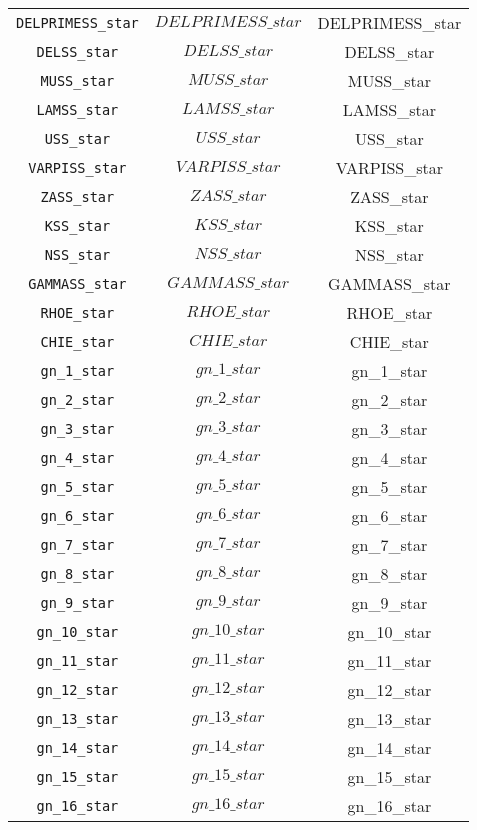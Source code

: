 \begin{center}
\begin{longtable}{ccc}
\texttt{DELPRIMESS\_star} & $DELPRIMESS\_star$ & DELPRIMESS\_star\\
\texttt{DELSS\_star} & $DELSS\_star$ & DELSS\_star\\
\texttt{MUSS\_star} & $MUSS\_star$ & MUSS\_star\\
\texttt{LAMSS\_star} & $LAMSS\_star$ & LAMSS\_star\\
\texttt{USS\_star} & $USS\_star$ & USS\_star\\
\texttt{VARPISS\_star} & $VARPISS\_star$ & VARPISS\_star\\
\texttt{ZASS\_star} & $ZASS\_star$ & ZASS\_star\\
\texttt{KSS\_star} & $KSS\_star$ & KSS\_star\\
\texttt{NSS\_star} & $NSS\_star$ & NSS\_star\\
\texttt{GAMMASS\_star} & $GAMMASS\_star$ & GAMMASS\_star\\
\texttt{RHOE\_star} & $RHOE\_star$ & RHOE\_star\\
\texttt{CHIE\_star} & $CHIE\_star$ & CHIE\_star\\
\texttt{gn\_1\_star} & $gn\_1\_star$ & gn\_1\_star\\
\texttt{gn\_2\_star} & $gn\_2\_star$ & gn\_2\_star\\
\texttt{gn\_3\_star} & $gn\_3\_star$ & gn\_3\_star\\
\texttt{gn\_4\_star} & $gn\_4\_star$ & gn\_4\_star\\
\texttt{gn\_5\_star} & $gn\_5\_star$ & gn\_5\_star\\
\texttt{gn\_6\_star} & $gn\_6\_star$ & gn\_6\_star\\
\texttt{gn\_7\_star} & $gn\_7\_star$ & gn\_7\_star\\
\texttt{gn\_8\_star} & $gn\_8\_star$ & gn\_8\_star\\
\texttt{gn\_9\_star} & $gn\_9\_star$ & gn\_9\_star\\
\texttt{gn\_10\_star} & $gn\_10\_star$ & gn\_10\_star\\
\texttt{gn\_11\_star} & $gn\_11\_star$ & gn\_11\_star\\
\texttt{gn\_12\_star} & $gn\_12\_star$ & gn\_12\_star\\
\texttt{gn\_13\_star} & $gn\_13\_star$ & gn\_13\_star\\
\texttt{gn\_14\_star} & $gn\_14\_star$ & gn\_14\_star\\
\texttt{gn\_15\_star} & $gn\_15\_star$ & gn\_15\_star\\
\texttt{gn\_16\_star} & $gn\_16\_star$ & gn\_16\_star\\

\end{longtable}
\end{center}

